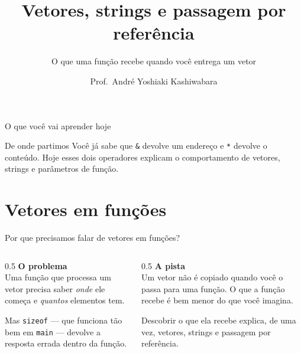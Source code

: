 \documentclass[aspectratio=169]{beamer}
\title{Vetores, strings e passagem por referência}
\subtitle{O que uma função recebe quando você entrega um vetor}
\author{Prof.\ André Yoshiaki Kashiwabara}
\institute{DCOMP -- Universidade Federal de Sergipe\\
\texttt{andreyoshiaki@dcomp.ufs.br}}
\date{}
\begin{document}
\begin{frame}[plain]
  \titlepage
\end{frame}

\begin{frame}{O que você vai aprender hoje}
  \begin{center}
  \end{center}
  \begin{block}{De onde partimos}
    Você já sabe que \texttt{\&} devolve um endereço e \texttt{*} devolve o
    conteúdo. Hoje esses dois operadores explicam o comportamento de vetores,
    strings e parâmetros de função.
  \end{block}
\end{frame}

\section{Vetores em funções}

\begin{frame}{Por que precisamos falar de vetores em funções?}
  \begin{columns}[T]
    \begin{column}{0.5\textwidth}
      \textbf{O problema}\\[0.3em]
      Uma função que processa um vetor precisa saber \emph{onde} ele começa e
      \emph{quantos} elementos tem.

      \medskip
      Mas \texttt{sizeof} --- que funciona tão bem em \texttt{main} --- devolve
      a resposta errada dentro da função.
    \end{column}
    \begin{column}{0.5\textwidth}
      \textbf{A pista}\\[0.3em]
      Um vetor não é copiado quando você o passa para uma função. O que a
      função recebe é bem menor do que você imagina.

      \medskip
      Descobrir o que ela recebe explica, de uma vez, vetores, strings e
      passagem por referência.
    \end{column}
  \end{columns}
\end{frame}
\end{document}
